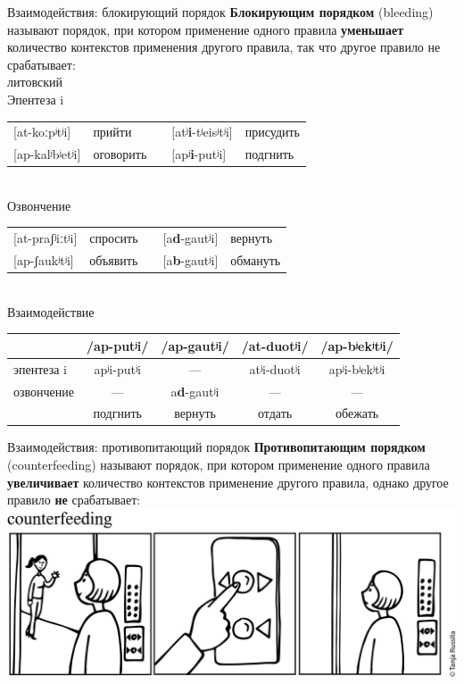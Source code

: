 \begin{frame}{Взаимодействия: блокирующий порядок}
\textbf{Блокирующим порядком} (bleeding) называют порядок, при котором применение одного правила \textbf{уменьшает} количество контекстов применения другого правила, так что другое правило не срабатывает:\\
\hfill литовский\\
Эпентеза i\\
\begin{tabular}{lllll}
[at-koːpʲtʲi] & прийти & & [atʲ\textbf{i}-tʲeisʲtʲi] & присудить \\ 

[ap-kalʲbʲetʲi] & оговорить & & [apʲ\textbf{i}-putʲi] & подгнить \\
\end{tabular}
\medskip\\Озвончение\\
\begin{tabular}{lllll}
[at-praʃʲiːtʲi] & спросить  && [a\textbf{d}-gautʲi] & вернуть\\ 

[ap-ʃaukʲtʲi] & объявить  && [a\textbf{b}-gautʲi] &  обмануть  \\
\end{tabular}
\medskip\\Взаимодействие\\
\begin{tabular}{l|c|c|c|c}
 & /ap-putʲi/ &/ap-gautʲi/ & /at-duotʲi/ & /ap-bʲekʲtʲi/ \\ \hline
эпентеза i & apʲi-putʲi & — & atʲi-duotʲi & apʲi-bʲekʲtʲi \\ \hline
озвончение &— & a\textbf{d}-gautʲi & — & — \\ \hline
&подгнить &вернуть & отдать & обежать\\ 
\end{tabular}
\end{frame}

\begin{frame}{Взаимодействия: противопитающий порядок}
\textbf{Противопитающим порядком} (counterfeeding) называют порядок, при котором применение одного правила \textbf{увеличивает} количество контекстов применение другого правила, однако другое правило \textbf{не} срабатывает:\\
\vfill
\includegraphics[width=\linewidth]{Russita-counterfeeding.png}
\end{frame}


